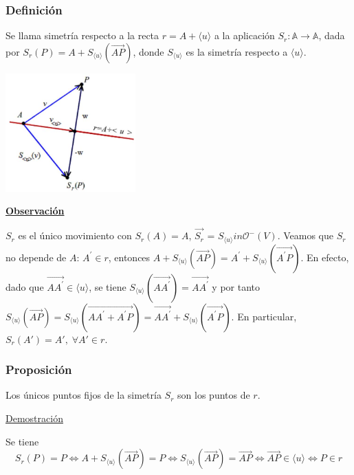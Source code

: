 \documentclass[12pt, a4paper, ones, notitlepage, openany,titlepage]{article}
\newcommand{\demostracion}{\noindent\underline{Demostración}}
\newcommand{\observacion}{\noindent\underline{\textbf{Observación}}}
\begin{document}
\subsubsection{Definición}
Se llama simetría respecto a la recta $r=A+\langle u\rangle$ a la aplicación $S_{r}: \mathbb{A} \rightarrow \mathbb{A}$, dada por $S_{r}(P)=A+S_{\langle u\rangle}(\overrightarrow{A P})$, donde $S_{\langle u\rangle}$ es la simetría respecto a $\langle u\rangle$.
\begin{center}
	\includegraphics[max width=5cm]{2023_04_25_301d1803eaf1bc74cfd9g-080}
\end{center}
\observacion

$S_r$ es el único movimiento con $S_r(A) = A$, $\vec{S_r}$ = $S_{\langle u \rangle} in \mathcal{O}^-(V)$. Veamos que $S_r$ no depende de $A$: $A^{\prime} \in r$, entonces $A+S_{\langle u\rangle}(\overrightarrow{A P})=A^{\prime}+S_{\langle u\rangle}\left(\overrightarrow{A^{\prime} P}\right)$. En efecto, dado que $\overrightarrow{A A^{\prime}} \in\langle u\rangle$, se tiene $S_{\langle u\rangle}\left(\overrightarrow{A A^{\prime}}\right)=\overrightarrow{A A^{\prime}}$ y por tanto $S_{\langle u\rangle}(\overrightarrow{A P})=S_{\langle u\rangle}\left(\overrightarrow{A A^{\prime}+A^{\prime} P}\right)=\overrightarrow{A A^{\prime}}+S_{\langle u\rangle}\left(\overrightarrow{A^{\prime} P}\right)$. En particular, $S_r(A') = A', \; \forall A' \in r$.

\subsubsection{Proposición}
Los únicos puntos fijos de la simetría $S_{r}$ son los puntos de $r$.

\demostracion

Se tiene
$$
S_{r}(P)=P \Longleftrightarrow A+S_{\langle u\rangle}(\overrightarrow{A P})=P \Longleftrightarrow S_{\langle u\rangle}(\overrightarrow{A P})=\overrightarrow{A P} \Longleftrightarrow \overrightarrow{A P} \in\langle u\rangle \Longleftrightarrow P \in r
$$
\end{document}
